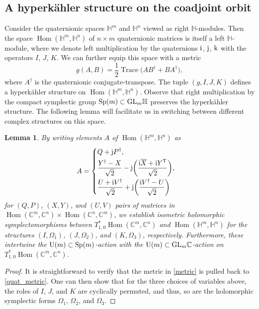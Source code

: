 \documentclass[pdftex]{sigma}
\numberwithin{equation}{section}
\newtheorem{Lemma}[Theorem]{Lemma}
\DeclareMathOperator{\Hom}{Hom}
\DeclareMathOperator{\Tr}{Trace}
\newcommand{\C}{\mathbb{C}}
\newcommand{\Q}{\mathbb{H}}
\begin{document}
\subsection{A hyperk\"{a}hler structure on the coadjoint orbit}
Consider the quaternionic spaces $\Q^m$ and $\Q^n$ viewed as right $\Q$-modules. Then the space $\Hom(\Q^m,\Q^n)$ of $n\times m$ quaternionic matrices is itself a left $\Q$-module, where we denote left multiplication by the quaternions ${\rm i}$, ${\rm j}$, ${\rm k}$
with the operators $I$, $J$, $K$. We can further equip this space with a metric%
\begin{equation}\label{quat_metric}
	g(A,B)=\frac{1}{2}\Tr\bigl(AB^\dagger+BA^\dagger\bigr),
\end{equation}
where $A^\dagger$ is the quaternionic conjugate-transpose. The tuple $(g,I,J,K)$ defines a hyperk\"{a}hler structure on $\Hom(\Q^m,\Q^n)$.
Observe that right multiplication by the compact symplectic group ${\rm Sp}(m)\subset {\rm GL}_m\Q$ preserves the hyperk\"{a}hler structure. The following lemma will facilitate us in switching between different complex structures on this space.
\begin{Lemma}\label{facilitate}
	By writing elements $A$ of $\Hom(\Q^m,\Q^n)$ as
	\begin{equation*}
		A=\begin{cases}
			\displaystyle Q+{\rm j}P^\dagger,\\[1mm]
			\displaystyle\frac{Y^\dagger-X}{\sqrt{2}}-{\rm j}\biggl(\frac{{\rm i}\overline{X}+{\rm i}Y^{\mathsf{T}}}{\sqrt{2}}\biggr),\vspace{1mm}\\
			\displaystyle\frac{U+{\rm i}V^\dagger}{\sqrt{2}}+{\rm j}\biggl(\frac{{\rm i}V^\dagger-U}{\sqrt{2}}\biggr)
		\end{cases}
	\end{equation*}
	for $(Q,P)$, $(X,Y)$, and $(U,V)$ pairs of matrices in $\Hom(\C^m,\C^n)\times\Hom(\C^n,\C^m)$, we establish isometric holomorphic symplectomorphisms between $T^*_{1,0}\Hom(\C^m,\C^n)$ and $\Hom(\Q^m,\Q^n)$ for the structures $(I,\Omega_1)$, $(J,\Omega_2)$, and $(K,\Omega_3)$, respectively. Furthermore, these intertwine the ${\rm U}(m)\subset {\rm Sp}(m)$-action with the ${\rm U}(m)\subset {\rm GL}_m\C$-action on $T^*_{1,0}\Hom(\C^m,\C^n)$.
\end{Lemma}
\begin{proof}
	It is straightforward to verify that the metric in \eqref{metric} is pulled back to \eqref{quat_metric}. One can then show that for the three choices of variables above, the roles of $I$, $J$, and $K$ are cyclically permuted, and thus, so are the holomorphic symplectic forms $\Omega_1$, $\Omega_2$, and $\Omega_3$.
\end{proof}
\end{document}
